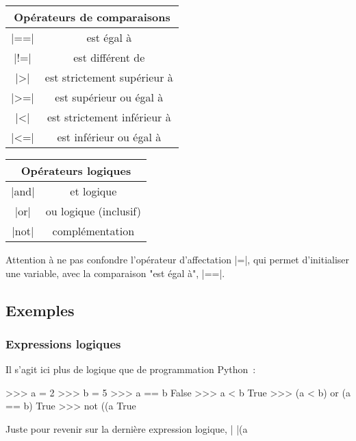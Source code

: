 		\begin{multicols}{2}
			\begin{tabular}{|c|c|} \hline
				\multicolumn{2}{|c|}{Opérateurs de comparaisons} \\ \hline \hline
				\python|==| & est égal à \\ \hline
				\python|!=| & est différent de \\ \hline
				\python|>| & est strictement supérieur à \\ \hline
				\python|>=| & est supérieur ou égal à \\ \hline
				\python|<| & est strictement inférieur à \\ \hline
				\python|<=| & est inférieur ou égal à \\ \hline 	
			\end{tabular}
			
			\columnbreak
			
			\begin{tabular}{|c|c|} \hline
				\multicolumn{2}{|c|}{Opérateurs logiques} \\ \hline \hline
				\python|and| & et logique \\ \hline
				\python|or| & ou logique (inclusif) \\ \hline
				\python|not| & complémentation \\ \hline
			\end{tabular}
		\end{multicols}
		
		Attention à ne pas confondre l'opérateur d'affectation \python|=|, qui permet d'initialiser une variable, avec la comparaison "est égal à", \python|==|.
	
	\subsection{Exemples}
	
		\subsubsection{Expressions logiques}
		Il s'agit ici plus de logique que de programmation Python~:
		\begin{pythoncode}
			>>> a = 2
			>>> b = 5
			>>> a == b
			False
			>>> a < b
			True
			>>> (a < b) or (a == b)
			True
			>>> not ((a %
			True
		\end{pythoncode}
		Juste pour revenir sur la dernière expression logique, \python|%
		\python|(a %
	
